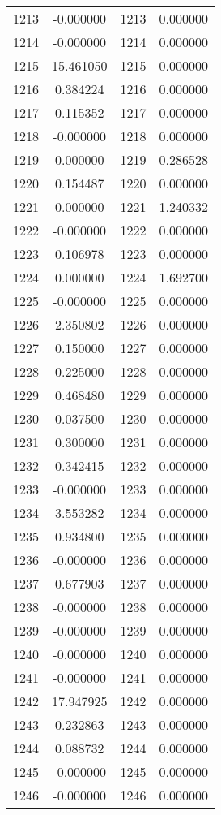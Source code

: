 \documentclass[12pt]{article}
\begin{document}
\begin{longtable}{@{}cccc@{}}
1213 & -0.000000 & 1213 & 0.000000 \\
1214 & -0.000000 & 1214 & 0.000000 \\
1215 & 15.461050 & 1215 & 0.000000 \\
1216 & 0.384224 & 1216 & 0.000000 \\
1217 & 0.115352 & 1217 & 0.000000 \\
1218 & -0.000000 & 1218 & 0.000000 \\
1219 & 0.000000 & 1219 & 0.286528 \\
1220 & 0.154487 & 1220 & 0.000000 \\
1221 & 0.000000 & 1221 & 1.240332 \\
1222 & -0.000000 & 1222 & 0.000000 \\
1223 & 0.106978 & 1223 & 0.000000 \\
1224 & 0.000000 & 1224 & 1.692700 \\
1225 & -0.000000 & 1225 & 0.000000 \\
1226 & 2.350802 & 1226 & 0.000000 \\
1227 & 0.150000 & 1227 & 0.000000 \\
1228 & 0.225000 & 1228 & 0.000000 \\
1229 & 0.468480 & 1229 & 0.000000 \\
1230 & 0.037500 & 1230 & 0.000000 \\
1231 & 0.300000 & 1231 & 0.000000 \\
1232 & 0.342415 & 1232 & 0.000000 \\
1233 & -0.000000 & 1233 & 0.000000 \\
1234 & 3.553282 & 1234 & 0.000000 \\
1235 & 0.934800 & 1235 & 0.000000 \\
1236 & -0.000000 & 1236 & 0.000000 \\
1237 & 0.677903 & 1237 & 0.000000 \\
1238 & -0.000000 & 1238 & 0.000000 \\
1239 & -0.000000 & 1239 & 0.000000 \\
1240 & -0.000000 & 1240 & 0.000000 \\
1241 & -0.000000 & 1241 & 0.000000 \\
1242 & 17.947925 & 1242 & 0.000000 \\
1243 & 0.232863 & 1243 & 0.000000 \\
1244 & 0.088732 & 1244 & 0.000000 \\
1245 & -0.000000 & 1245 & 0.000000 \\
1246 & -0.000000 & 1246 & 0.000000 \\

\end{longtable}
\end{document}
